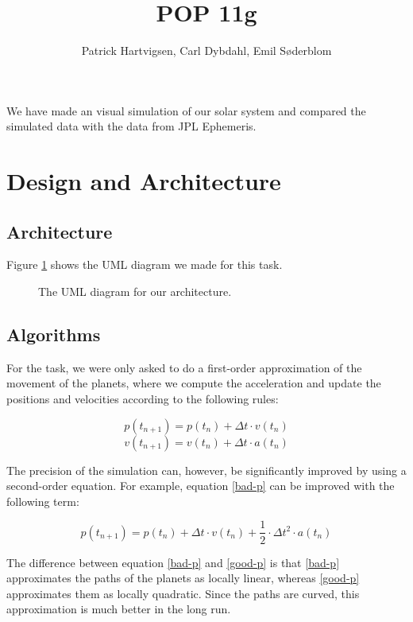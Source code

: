 \documentclass[a4paper]{article}
\title{POP 11g}
\author{Patrick Hartvigsen, Carl Dybdahl, Emil Søderblom}
\begin{document}
\maketitle

We have made an visual simulation of our solar system and compared the simulated data with the data from JPL Ephemeris.

\section{Design and Architecture}

\subsection{Architecture}

Figure \ref{uml} shows the UML diagram we made for this task. 

\begin{figure}[!ht]
\centering
\caption{The UML diagram for our architecture.}
\label{uml}
\end{figure}

\subsection{Algorithms}

For the task, we were only asked to do a first-order approximation of the movement of the planets, where we compute the acceleration and update the positions and velocities according to the following rules:

\begin{equation} \label{bad-p}
p(t_{n+1}) = p(t_n) + \Delta t \cdot v(t_n)
\end{equation}
\begin{equation} \label{bad-v}
v(t_{n+1}) = v(t_n) + \Delta t \cdot a(t_n)
\end{equation}

The precision of the simulation can, however, be significantly improved by using a second-order equation. For example, equation \ref{bad-p} can be improved with the following term:

\begin{equation} \label{good-p}
p(t_{n+1}) = p(t_n) + \Delta t \cdot v(t_n) + \frac{1}{2} \cdot \Delta t^2 \cdot a(t_n)
\end{equation}

The difference between equation \ref{bad-p} and \ref{good-p} is that \ref{bad-p} approximates the paths of the planets as locally linear, whereas \ref{good-p} approximates them as locally quadratic. Since the paths are curved, this approximation is much better in the long run.
\end{document}
